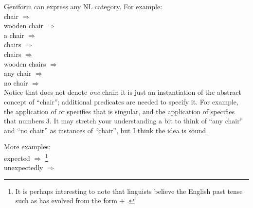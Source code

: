 Geniform can express any NL category.  For example:\\
\tab chair $\Longrightarrow$ \\
\tab wooden chair $\Longrightarrow$ \\
\tab a chair $\Longrightarrow$ \\
\tab chairs $\Longrightarrow$ \\
 chairs $\Longrightarrow$ \\
 wooden chairs $\Longrightarrow$ \\
\tab any chair $\Longrightarrow$ \\
\tab no chair $\Longrightarrow$ \\
Notice that  does not denote \textit{one} chair; it is just an instantiation of the abstract concept of ``chair''; additional predicates are needed to specify it.  For example, the application of  or  specifies that  is singular, and the application of  specifies that  numbers 3.  It may stretch your understanding a bit to think of ``any chair'' and ``no chair'' as instances of ``chair'', but I think the idea is sound.


More examples:\\
\tab expected $\Longrightarrow$  \footnote{It is perhaps interesting to note that linguists believe the English past tense such as  has evolved from the form  + .}\\
\tab unexpectedly $\Longrightarrow$ 


